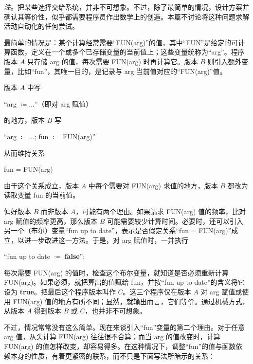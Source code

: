\noindent
\textit{注}。把某些选择交给系统，并非不可想象。不过，除了最简单的情况，设计方案并确认其等价性，似乎都需要程序员作出数学上的创造。本篇不讨论将这种问题求解活动自动化的任何尝试。

最简单的情况是：某个计算经常需要“FUN(arg)”的值，其中“FUN”是给定的可计算函数，定义在一个或多个已存储变量的当前值上；这些变量统称为“arg”。程序版本 $A$ 只存储 arg 的值，每次需要 FUN(arg) 时再计算它。版本 $B$ 则引入额外变量，比如“fun”，其唯一目的，是记录与 arg 当前值对应的“FUN(arg)”值。

版本 $A$ 中写
\medskip

{
	\setlength{\parindent}{8em}
	\hspace{-.4em}``arg $\coloneq \dots$''（即对 arg 赋值）
	
}
\medskip

\noindent
的地方，版本 $B$ 写
\medskip

{
	\setlength{\parindent}{8em}
	\hspace{-.4em}``arg $\coloneq \dots$; fun $\coloneq$ FUN(arg)''
	
}
\medskip

\noindent
从而维持关系
\medskip

{
	\setlength{\parindent}{8em}
	fun = FUN(arg)
}
\medskip

\noindent
由于这个关系成立，版本 $A$ 中每个需要对 FUN(arg) 求值的地方，版本 $B$ 都改为读取变量 fun 的当前值。

偏好版本 $B$ 而非版本 $A$，可能有两个理由。如果请求 FUN(arg) 值的频率，比对 arg 赋值的频率更高，那么版本 $B$ 可能需要较少计算时间。必要时，还可以引入另一个（布尔）变量“fun up to date”，表示是否假定关系“fun = FUN(arg)”成立，以进一步改进这一方法。于是，对 arg 赋值时，一并执行
\medskip

{
	\setlength{\parindent}{8em}
	\hspace{-.4em}``fun up to date $\coloneq$ \textbf{false}'';
}
\medskip

\noindent
每次需要 FUN(arg) 的值时，检查这个布尔变量，就知道是否必须重新计算 FUN(arg)。如果必须，就把算出的值赋给 fun，并按“fun up to date”的含义将它设为 \textbf{true}。把最后这个程序版本叫作 $C$。这三个程序仅在版本 $A$ 对 arg 赋值或使用 FUN(arg) 值的地方有所不同；显然，就输出而言，它们等价。通过机械方式，从版本 $A$ 得到版本 $B$ 或 $C$，也并非不可想象。

不过，情况常常没有这么简单。现在来谈引入“fun”变量的第二个理由。对于任意 arg 值，从头计算 FUN(arg) 往往很不合算；而当 arg 的值改变时，计算 FUN(arg) 的值怎样改变，却容易得多。在这种情况下，调整“fun”的值与函数依赖本身的性质，有着更紧密的联系，而不只是下面写法所暗示的关系：
\medskip

